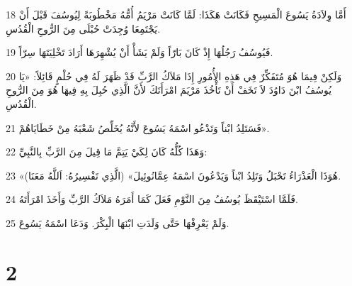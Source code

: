 \par 18 أَمَّا وِلاَدَةُ يَسُوعَ الْمَسِيحِ فَكَانَتْ هَكَذَا: لَمَّا كَانَتْ مَرْيَمُ أُمُّهُ مَخْطُوبَةً لِيُوسُفَ قَبْلَ أَنْ يَجْتَمِعَا وُجِدَتْ حُبْلَى مِنَ الرُّوحِ الْقُدُسِ.
\par 19 فَيُوسُفُ رَجُلُهَا إِذْ كَانَ بَارّاً وَلَمْ يَشَأْ أَنْ يُشْهِرَهَا أَرَادَ تَخْلِيَتَهَا سِرّاً.
\par 20 وَلَكِنْ فِيمَا هُوَ مُتَفَكِّرٌ فِي هَذِهِ الأُمُورِ إِذَا مَلاَكُ الرَّبِّ قَدْ ظَهَرَ لَهُ فِي حُلْمٍ قَائِلاً: «يَا يُوسُفُ ابْنَ دَاوُدَ لاَ تَخَفْ أَنْ تَأْخُذَ مَرْيَمَ امْرَأَتَكَ لأَنَّ الَّذِي حُبِلَ بِهِ فِيهَا هُوَ مِنَ الرُّوحِ الْقُدُسِ.
\par 21 فَسَتَلِدُ ابْناً وَتَدْعُو اسْمَهُ يَسُوعَ لأَنَّهُ يُخَلِّصُ شَعْبَهُ مِنْ خَطَايَاهُمْ».
\par 22 وَهَذَا كُلُّهُ كَانَ لِكَيْ يَتِمَّ مَا قِيلَ مِنَ الرَّبِّ بِالنَّبِيِّ:
\par 23 «هُوَذَا الْعَذْرَاءُ تَحْبَلُ وَتَلِدُ ابْناً وَيَدْعُونَ اسْمَهُ عِمَّانُوئِيلَ» (الَّذِي تَفْسِيرُهُ: اَللَّهُ مَعَنَا).
\par 24 فَلَمَّا اسْتَيْقَظَ يُوسُفُ مِنَ النَّوْمِ فَعَلَ كَمَا أَمَرَهُ مَلاَكُ الرَّبِّ وَأَخَذَ امْرَأَتَهُ.
\par 25 وَلَمْ يَعْرِفْهَا حَتَّى وَلَدَتِ ابْنَهَا الْبِكْرَ. وَدَعَا اسْمَهُ يَسُوعَ.

\chapter{2}

